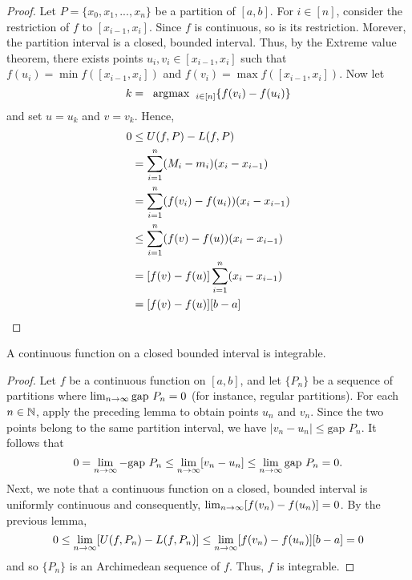 \documentclass[letterpaper, twoside, 12pt]{book}
\begin{document}
\begin{proof}
    Let \(P = \{x_0, x_1, ..., x_n\}\) be a partition of \([a,b]\). For
    \(i \in [n]\), consider the restriction of \(f\) to \([x_{i-1}, x_i]\).
    Since \(f\) is continuous, so is its restriction. Morever, the partition
    interval is a closed, bounded interval. Thus, by the Extreme value theorem,
    there exists points \(u_i, v_i \in [x_{i-1}, x_i]\) such that
    \(f(u_i) = \min f([x_{i-1}, x_i])\) and \(f(v_i) = \max f([x_{i-1}, x_i])\).
    Now let \[k = \hspace{2mm} \text{argmax} \hspace{2mm}_{i \in [n]} \{ f(v_i) - f(u_i) \} \]
    and set \(u = u_k\) and \(v = v_k\). Hence,
    \begin{align*}
        0  &\leq U(f, P) - L(f, P) \\
           &= \sum_{i = 1}^n (M_i - m_i)(x_i - x_{i-1}) \\
           &= \sum_{i = 1}^n (f(v_i) - f(u_i))(x_i - x_{i-1}) \\
           &\leq \sum_{i = 1}^n (f(v) - f(u))(x_i - x_{i-1}) \\
           &= [f(v) - f(u)] \sum_{i = 1}^n (x_i - x_{i-1}) \\
           &= [f(v) - f(u)] [b - a] \\
    \end{align*}
\end{proof}


\begin{theorem}[6.18]
  A continuous function on a closed bounded interval is integrable.
\end{theorem}

\begin{proof}
    Let \(f\) be a continuous function on \([a,b]\), and
    let \(\{P_n\}\) be a sequence of partitions where \(\lim_{n \to \infty} \text{gap~} P_n = 0\)
    (for instance, regular partitions). For each \(n \in \mathbb N\),
    apply the preceding lemma to obtain points \(u_n\) and \(v_n\). Since the two points
    belong to the same partition interval, we have \(|v_n - u_n| \leq \text{gap~} P_n\).
    It follows that
    \[ 0 = \lim_{n \to \infty} - \text{gap~} P_n \leq \lim_{n \to \infty} [v_n - u_n] \leq \lim_{n \to \infty} \text{gap~} P_n = 0. \]
    Next, we note that a continuous function on a closed, bounded interval
    is uniformly continuous and consequently, \(\lim_{n \to \infty} [f(v_n) - f(u_n)] = 0\).
    By the previous lemma,
    \[ 0 \leq \lim_{n \to \infty} [ U(f, P_n) - L(f, P_n)] \leq \lim_{n \to \infty} [f(v_n) - f(u_n)][b - a] = 0 \]
    and so \(\{P_n\}\) is an Archimedean sequence of \(f\). Thus, \(f\)
    is integrable.
\end{proof}
\end{document}

